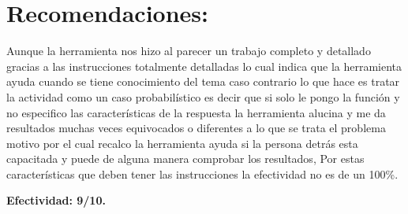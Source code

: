 \documentclass[12pt,a4paper]{article}
\begin{document}
	\section*{Recomendaciones:}
	
	Aunque la herramienta nos hizo al parecer un trabajo completo y detallado gracias a las instrucciones totalmente detalladas lo cual indica que la herramienta ayuda cuando se tiene conocimiento del tema caso contrario lo que hace es tratar la actividad como un caso probabilístico es decir que si solo le pongo la función y no especifico las características de la respuesta la herramienta alucina y me da resultados muchas veces equivocados o diferentes a lo que se trata el problema motivo por el cual recalco la herramienta ayuda si la persona detrás esta capacitada y puede de alguna manera comprobar los resultados, Por estas características que deben tener las instrucciones la efectividad no es de un 100\%.
	
	\vspace{0.5cm}
	
	\textbf{Efectividad: 9/10.}
	
\end{document}
